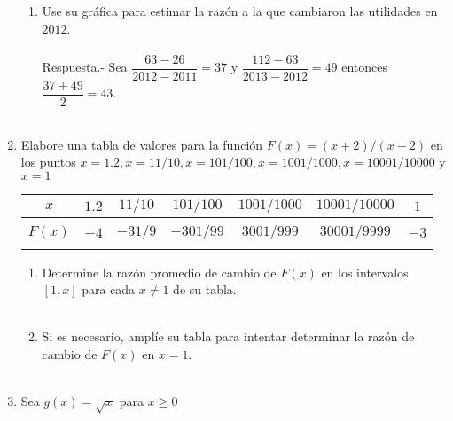 \begin{enumerate}
\begin{enumerate}[\bfseries a)]
    \item Use su gráfica para estimar la razón a la que cambiaron las utilidades en $2012$.\\\\
	Respuesta.-\; Sea $\dfrac{63-26}{2012-2011} = 37$ y $\dfrac{112-63}{2013-2012} = 49$ entonces $\dfrac{37+49}{2} = 43$.\\\\

\end{enumerate}

\item Elabore una tabla de valores para la función $F(x) = (x + 2)/(x - 2)$ en los puntos $x = 1.2, x = 11/10, x = 101/100, x = 1001/1000, x = 10001/10000$ y $x = 1$\\

	\begin{center}
	\begin{tabular}{ccccccc}
	    $x$&$1.2$&$11/10$&$101/100$&$1001/1000$&$10001/10000$&$1$\\
	    \hline\\
	    $F(x)$&$-4$&$-31/9$&$-301/99$&$3001/999$&$30001/9999$&$-3$\\\\
	\end{tabular}
	\end{center}

\begin{enumerate}[\bfseries a)]
    
    \item Determine la razón promedio de cambio de $F(x)$ en los intervalos $[1, x]$ para cada $x \neq 1$ de su tabla.\\\\


    \item Si es necesario, amplíe su tabla para intentar determinar la razón de cambio de $F(x)$ en $x = 1$.\\\\

\end{enumerate}


\item Sea $g(x)=\sqrt{x}$ para $x\geq 0$\\\\
\begin{enumerate}[\bfseries a)]
    

\end{enumerate}
\end{enumerate}
